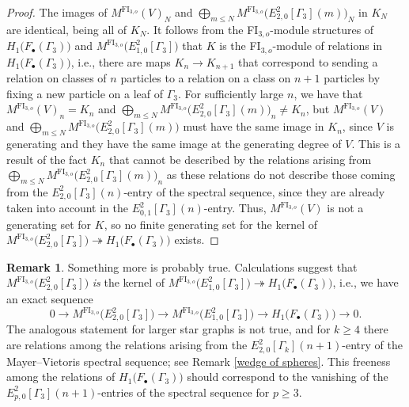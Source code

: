 \documentclass[pagebackref,colorlinks,citecolor=blue,linkcolor=blue,urlcolor=blue,filecolor=blue]{article}
\theoremstyle{definition}\newtheorem{definition}[thm]{Definition}
\theoremstyle{definition}
\newtheorem{remark}[thm]{Remark}
\begin{document}
\begin{proof}
The images of $M^{\text{FI}_{3,o}}(V)_{N}$ and $\bigoplus_{m\le N}M^{\text{FI}_{3,o}}\big(E^{2}_{2,0}[\Gamma_{3}](m)\big)_{N}$ in $K_{N}$ are identical, being all of $K_{N}$.
It follows from the FI$_{3,o}$-module structures of $H_{1}\big(F_{\bullet}(\Gamma_{3})\big)$ and $M^{\text{FI}_{3,o}}\big(E^{2}_{1,0}[\Gamma_{3}]\big)$ that $K$ is the FI$_{3, o}$-module of relations in $H_{1}\big(F_{\bullet}(\Gamma_{3})\big)$, i.e., there are maps $K_{n}\to K_{n+1}$ that correspond to sending a relation on classes of $n$ particles to a relation on a class on $n+1$ particles by fixing a new particle on a leaf of $\Gamma_{3}$.
For sufficiently large $n$, we have that $M^{\text{FI}_{3,o}}(V)_{n}=K_{n}$ and $\bigoplus_{m\le N}M^{\text{FI}_{3,o}}\big(E^{2}_{2,0}[\Gamma_{3}](m)\big)_{n}\neq K_{n}$, but $M^{\text{FI}_{3,o}}(V)$ and $\bigoplus_{m\le N}M^{\text{FI}_{3,o}}\big(E^{2}_{2,0}[\Gamma_{3}](m)\big)$ must have the same image in $K_{n}$, since $V$ is generating and they have the same image at the generating degree of $V$.
This is a result of the fact $K_{n}$ that cannot be described by the relations arising from $\bigoplus_{m\le N}M^{\text{FI}_{3,o}}\big(E^{2}_{2,0}[\Gamma_{3}](m)\big)_{n}$ as these relations do not describe those coming from the $E^{2}_{2,0}[\Gamma_{3}](n)$-entry of the spectral sequence, since they are already taken into account in the $E^{2}_{0,1}[\Gamma_{3}](n)$-entry.
Thus, $M^{\text{FI}_{3,o}}(V)$ is not a generating set for $K$, so no finite generating set for the kernel of $M^{\text{FI}_{3,o}}\big(E^{2}_{2,0}[\Gamma_{3}]\big)\twoheadrightarrow H_{1}\big(F_{\bullet}(\Gamma_{3})\big)$ exists.
\end{proof}

\begin{remark}
Something more is probably true.
Calculations suggest that $M^{\text{FI}_{3,o}}\big(E^{2}_{2,0}[\Gamma_{3}]\big)$ \emph{is} the kernel of $M^{\text{FI}_{3,o}}\big(E^{2}_{1,0}[\Gamma_{3}]\big)\twoheadrightarrow H_{1}\big(F_{\bullet}(\Gamma_{3})\big)$, i.e., we have an exact sequence
\[
0\to M^{\text{FI}_{3,o}}\big(E^{2}_{2,0}[\Gamma_{3}]\big)\to M^{\text{FI}_{3,o}}\big(E^{2}_{1,0}[\Gamma_{3}]\big)\to H_{1}\big(F_{\bullet}(\Gamma_{3})\big)\to 0.
\]
The analogous statement for larger star graphs is not true, and for $k\ge 4$ there are relations among the relations arising from the $E^{2}_{2,0}[\Gamma_{k}](n+1)$-entry of the Mayer--Vietoris spectral sequence; see Remark \ref{wedge of spheres}.
This freeness among the relations of $H_{1}\big(F_{\bullet}(\Gamma_{3})\big)$ should correspond to the vanishing of the $E^{2}_{p,0}[\Gamma_{3}](n+1)$-entries of the spectral sequence for $p\ge 3$.
\end{remark}
\end{document}
